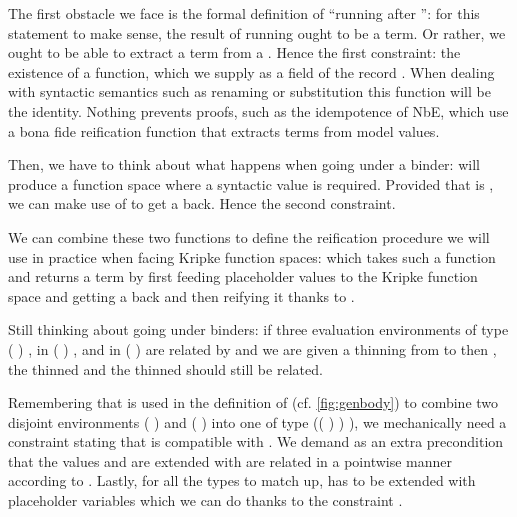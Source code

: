
The first obstacle we face is the formal definition of ``running 
after '': for this statement to make sense, the result of running
 ought to be a term. Or rather, we ought to be able to extract a
term from a . Hence the first constraint: the existence of a
 function, which we supply as a field of the record .
When dealing with syntactic semantics such as renaming or substitution
this function will be the identity. Nothing prevents proofs, such as the
idempotence of NbE, which use a bona fide reification function that extracts
terms from model values.


Then, we have to think about what happens when going under a binder: 
will produce a  function space where a syntactic value is required.
Provided that  is , we can make use of  to get a
 back. Hence the second constraint.


We can combine these two functions to define the reification procedure we will
use in practice when facing Kripke function spaces:  which takes such
a function and returns a term by first feeding placeholder values to the Kripke
function space and getting a  back and then reifying it thanks to .


Still thinking about going under binders: if three evaluation environments  of
type {( )  },  in {( )  },
and  in {( )  } are related by  and we are
given a thinning  from  to  then , the thinned  and the
thinned  should still be related.


Remembering that \AF{\_>>\_} is used in the definition of  (cf. \cref{fig:genbody})
to combine two disjoint environments {( )  } and
{( )  } into one of type
{(( \AF{++} ) )  )}, we mechanically need a
constraint stating that \AF{\_>>\_} is compatible with . We demand
as an extra precondition that the values  and  are extended
with are related in a pointwise manner according to . Lastly, for all
the types to match up,  has to be extended with placeholder variables
which we can do thanks to the  constraint .

